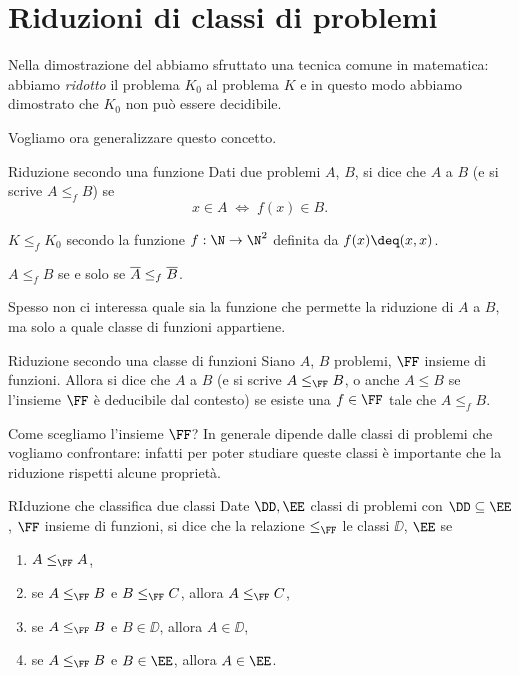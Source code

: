\section{Riduzioni di classi di problemi}

Nella dimostrazione del  abbiamo sfruttato una tecnica comune in matematica: abbiamo \emph{ridotto} il problema $K_0$ al problema $K$ e in questo modo abbiamo dimostrato che $K_0$ non può essere decidibile.

Vogliamo ora generalizzare questo concetto.

\begin{definition}
    {Riduzione secondo una funzione}{}
    Dati due problemi $A$, $B$, si dice che $A$  a $B$ (e si scrive $A \leq_f B$) se \[
        x \in A \;\iff\; f(x) \in B.
    \] 
\end{definition}

\begin{remark}
    $K \leq_f K_0$ secondo la funzione $f : \N \to \N^2$ definita da $f(x) \deq (x, x)$.   
\end{remark}

\begin{remark}
    $A \leq_f B$ se e solo se $\overline{A} \leq_f \overline{B}$.  
\end{remark}

Spesso non ci interessa quale sia la funzione che permette la riduzione di $A$ a $B$, ma solo a quale classe di funzioni appartiene.

\begin{definition}
    {Riduzione secondo una classe di funzioni}{}
    Siano $A$, $B$ problemi, $\FF$ insieme di funzioni. Allora si dice che $A$  a $B$ (e si scrive $A \leq_{\FF} B$, o anche $A \leq B$ se l'insieme $\FF$ è deducibile dal contesto) se esiste una $f \in \FF$ tale che $A \leq_f B$.   
\end{definition}

Come scegliamo l'insieme $\FF$? In generale dipende dalle classi di problemi che vogliamo confrontare: infatti per poter studiare queste classi è importante che la riduzione rispetti alcune proprietà.

\begin{definition}
    {RIduzione che classifica due classi}{}
    Date $\DD, \EE$ classi di problemi con $\DD \subseteq \EE$, $\FF$ insieme di funzioni, si dice che la relazione $\leq_{\FF}$  le classi $\DD$, $\EE$ se \begin{enumerate}
        \item $A \leq_{\FF} A$,
        \item se $A \leq_{\FF} B$ e $B \leq_{\FF} C$, allora $A \leq_{\FF} C$,
        \item se $A \leq_{\FF} B$ e $B \in \DD$, allora $A \in \DD$,
        \item se $A \leq_{\FF} B$ e $B \in \EE$, allora $A \in \EE$.       
    \end{enumerate}   
\end{definition}

